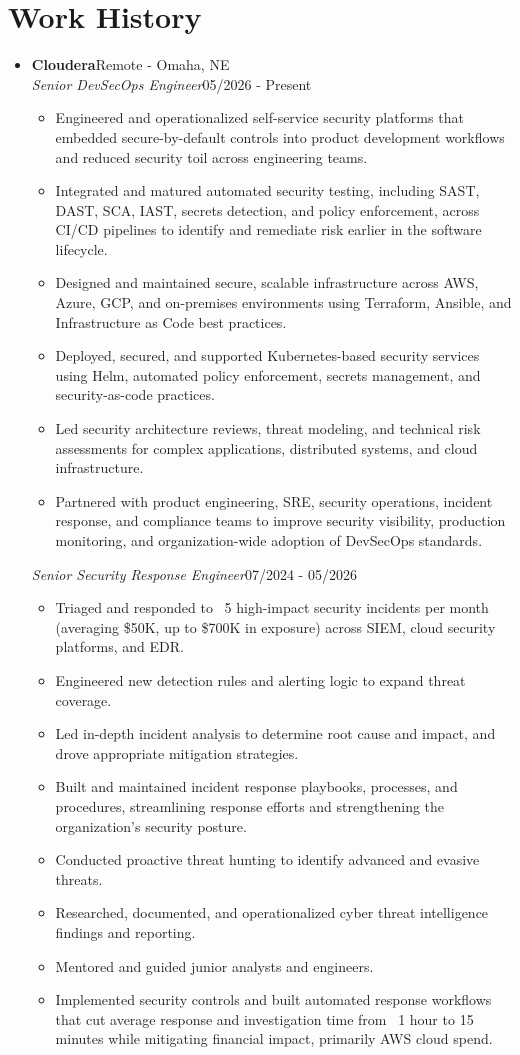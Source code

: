 \documentclass[letterpaper,9pt]{extarticle}
\newcommand{\resumeCompany}[2]{%
  \vspace{0.2em}%
  \textbf{#1}\hfill{\small\color{muted}#2}\\[0.2em]%
}
\newcommand{\resumePosition}[2]{%
  {\small\textit{#1}}\hfill{\small #2}%
}
\newcommand{\resumeItem}[1]{\item\small #1}
\begin{document}
\section*{Work History}
\begin{itemize}[leftmargin=0pt, label={}, itemsep=0.35em]

  \item
  \resumeCompany{Cloudera}{Remote - Omaha, NE}
  \resumePosition{Senior DevSecOps Engineer}{05/2026 - Present}
  \begin{itemize}
    \resumeItem{Engineered and operationalized self-service security platforms that embedded secure-by-default controls into product development workflows and reduced security toil across engineering teams.}
    \resumeItem{Integrated and matured automated security testing, including SAST, DAST, SCA, IAST, secrets detection, and policy enforcement, across CI/CD pipelines to identify and remediate risk earlier in the software lifecycle.}
    \resumeItem{Designed and maintained secure, scalable infrastructure across AWS, Azure, GCP, and on-premises environments using Terraform, Ansible, and Infrastructure as Code best practices.}
    \resumeItem{Deployed, secured, and supported Kubernetes-based security services using Helm, automated policy enforcement, secrets management, and security-as-code practices.}
    \resumeItem{Led security architecture reviews, threat modeling, and technical risk assessments for complex applications, distributed systems, and cloud infrastructure.}
    \resumeItem{Partnered with product engineering, SRE, security operations, incident response, and compliance teams to improve security visibility, production monitoring, and organization-wide adoption of DevSecOps standards.}
  \end{itemize}
  \vspace{0.25em}
  \resumePosition{Senior Security Response Engineer}{07/2024 - 05/2026}
  \begin{itemize}
    \resumeItem{Triaged and responded to ~5 high-impact security incidents per month (averaging \$50K, up to \$700K in exposure) across SIEM, cloud security platforms, and EDR.}
    \resumeItem{Engineered new detection rules and alerting logic to expand threat coverage.}
    \resumeItem{Led in-depth incident analysis to determine root cause and impact, and drove appropriate mitigation strategies.}
    \resumeItem{Built and maintained incident response playbooks, processes, and procedures, streamlining response efforts and strengthening the organization's security posture.}
    \resumeItem{Conducted proactive threat hunting to identify advanced and evasive threats.}
    \resumeItem{Researched, documented, and operationalized cyber threat intelligence findings and reporting.}
    \resumeItem{Mentored and guided junior analysts and engineers.}
    \resumeItem{Implemented security controls and built automated response workflows that cut average response and investigation time from ~1 hour to 15 minutes while mitigating financial impact, primarily AWS cloud spend.}
  \end{itemize}


\end{itemize}
\end{document}
